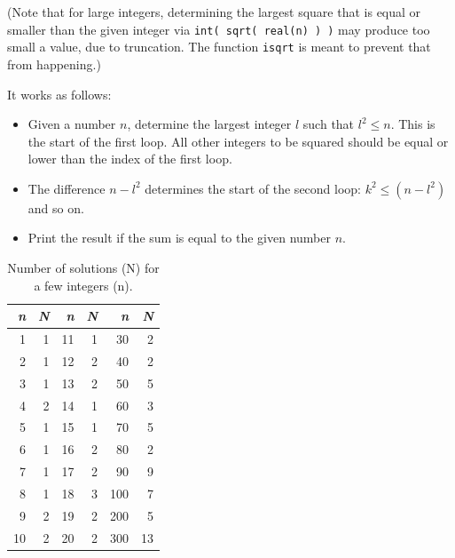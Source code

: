 \documentclass[onecolumn]{article}
\begin{document}
(Note that for large integers, determining the largest square that is equal or smaller than the given integer via \verb+int( sqrt( real(n) ) )+ may produce
too small a value, due to truncation. The function \verb+isqrt+ is meant to prevent that from happening.)

It works as follows:
\begin{itemize}
\item
Given a number $n$, determine the largest integer $l$ such that $l^2 \leq n$. This is the start of the first loop. All other integers to be squared
should be equal or lower than the index of the first loop.
\item
The difference $n - l^2$ determines the start of the second loop: $k^2 \leq (n - l^2)$ and so on.
\item
Print the result if the sum is equal to the given number $n$.
\end{itemize}

\begin{table}
\begin{center}
\caption{Number of solutions (N) for a few integers (n).}
\label{uptofour}
\begin{tabular}{rr|rr|rr}
\emph{n} & \emph{N} & \emph{n} & \emph{N} & \emph{n} & \emph{N} \\
\hline
    1    &    1     &   11     &     1    &   30     &     2    \\
    2    &    1     &   12     &     2    &   40     &     2    \\
    3    &    1     &   13     &     2    &   50     &     5    \\
    4    &    2     &   14     &     1    &   60     &     3    \\
    5    &    1     &   15     &     1    &   70     &     5    \\
    6    &    1     &   16     &     2    &   80     &     2    \\
    7    &    1     &   17     &     2    &   90     &     9    \\
    8    &    1     &   18     &     3    &   100    &     7    \\
    9    &    2     &   19     &     2    &   200    &     5    \\
   10    &    2     &   20     &     2    &   300    &    13    \\
\hline
\end{tabular}
\end{center}
\end{table}
\end{document}
